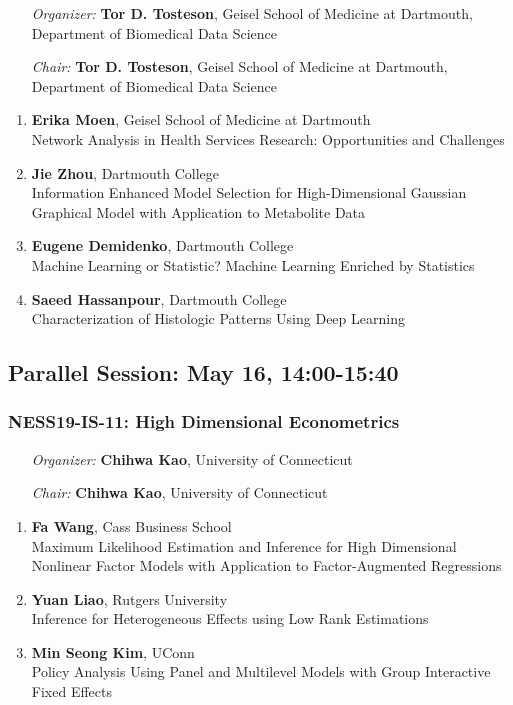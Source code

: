 \begin{enumerate}[align=left]
\item [\emph{Organizer:}] \textbf{Tor D. Tosteson}, Geisel School of Medicine at Dartmouth, Department of Biomedical Data Science
\item [\emph{Chair:}] \textbf{Tor D. Tosteson}, Geisel School of Medicine at Dartmouth, Department of Biomedical Data Science
\end{enumerate}

\begin{enumerate}
\item \textbf{Erika Moen}, Geisel School of Medicine at Dartmouth \\
Network Analysis in Health Services Research: Opportunities and Challenges
\item \textbf{Jie Zhou}, Dartmouth College \\
Information Enhanced Model Selection for High-Dimensional Gaussian Graphical Model with Application to Metabolite Data
\item \textbf{Eugene Demidenko}, Dartmouth College \\
Machine Learning or Statistic? Machine Learning Enriched by Statistics
\item \textbf{Saeed Hassanpour}, Dartmouth College \\
Characterization of Histologic Patterns Using Deep Learning
\end{enumerate}

\subsection*{Parallel Session: May 16, 14:00-15:40}

\subsubsection*{NESS19-IS-11: High Dimensional Econometrics}

\begin{enumerate}[align=left]
\item [\emph{Organizer:}] \textbf{Chihwa Kao}, University of Connecticut
\item [\emph{Chair:}] \textbf{Chihwa Kao}, University of Connecticut
\end{enumerate}

\begin{enumerate}
\item \textbf{Fa Wang}, Cass Business School \\
Maximum Likelihood Estimation and Inference for High Dimensional Nonlinear Factor Models with Application to Factor-Augmented Regressions
\item \textbf{Yuan Liao}, Rutgers University \\
Inference for Heterogeneous Effects using Low Rank Estimations
\item \textbf{Min Seong Kim}, UConn \\
Policy Analysis Using Panel and Multilevel Models with Group Interactive Fixed Effects
\end{enumerate}

